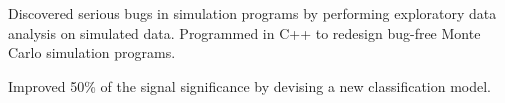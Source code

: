 \documentclass[letterpaper]{deedy-resume-openfont}
\begin{document}
\begin{tightemize}
\item Discovered serious bugs in simulation programs by performing exploratory data analysis on simulated data.
Programmed in C++ to redesign bug-free Monte Carlo simulation programs.
\item Improved 50\% of the signal significance by devising a new classification model.
\end{tightemize}
\sectionsep
\end{document}
